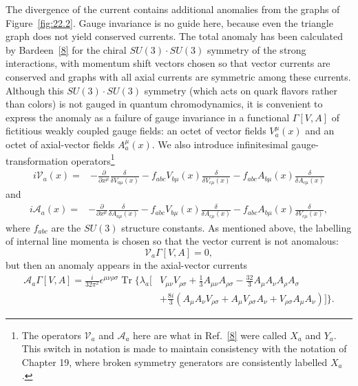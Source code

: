 The divergence of the current contains additional anomalies from the graphs
of Figure~\ref{fig:22.2}. Gauge invariance is no guide here, because even
the triangle graph does not yield conserved currents. The total anomaly has
been calculated by Bardeen~\hyperref[ch22-ref-8]{[8]} for the chiral
$SU(3)\cdot SU(3)$ symmetry of the strong interactions, with momentum shift
vectors chosen so that vector currents are conserved and graphs with all
axial currents are symmetric among these currents. Although this
$SU(3)\cdot SU(3)$ symmetry (which acts on quark flavors rather than colors)
is not gauged in quantum chromodynamics, it is convenient to express the
anomaly as a failure of gauge invariance in a functional $\Gamma[V,A]$ of
fictitious weakly coupled gauge fields: an octet of vector fields
$V_a^\mu(x)$ and an octet of axial-vector fields $A_a^\mu(x)$. We also
introduce infinitesimal gauge-transformation operators\footnote{The
operators $\mathcal V_a$ and $\mathcal A_a$ here are what in
Ref.~\hyperref[ch22-ref-8]{[8]} were called $X_a$ and $Y_a$. This switch in
notation is made to maintain consistency with the notation of Chapter 19,
where broken symmetry generators are consistently labelled $X_a$.}
\begin{equation}
 \begin{aligned}
 i\mathcal V_a(x)
 ={}&-\frac{\partial}{\partial x^\mu}
 \frac{\delta}{\delta V_{a\mu}(x)}
 -f_{abc}V_{b\mu}(x)\frac{\delta}{\delta V_{c\mu}(x)}
 -f_{abc}A_{b\mu}(x)\frac{\delta}{\delta A_{c\mu}(x)}
 \end{aligned}
 \tag{22.3.31}\label{eq:22.3.31}
\end{equation}
and
\begin{equation}
 \begin{aligned}
 i\mathcal A_a(x)
 ={}&-\frac{\partial}{\partial x^\mu}
 \frac{\delta}{\delta A_{a\mu}(x)}
 -f_{abc}V_{b\mu}(x)\frac{\delta}{\delta A_{c\mu}(x)}
 -f_{abc}A_{b\mu}(x)\frac{\delta}{\delta V_{c\mu}(x)},
 \end{aligned}
 \tag{22.3.32}\label{eq:22.3.32}
\end{equation}
where $f_{abc}$ are the $SU(3)$ structure constants. As mentioned above,
the labelling of internal line momenta is chosen so that the vector current
is not anomalous:
\begin{equation}
 \mathcal V_a\Gamma[V,A]=0,
 \tag{22.3.33}\label{eq:22.3.33}
\end{equation}
but then an anomaly appears in the axial-vector currents
\begin{equation}
 \begin{aligned}
 \mathcal A_a\Gamma[V,A]
 =\frac{i}{32\pi^2}\epsilon^{\mu\nu\rho\sigma}
 \operatorname{Tr}\Biggl\{\lambda_a\Biggl[
 &V_{\mu\nu}V_{\rho\sigma}
 +\frac13A_{\mu\nu}A_{\rho\sigma}
 -\frac{32}{3}A_\mu A_\nu A_\rho A_\sigma
 \\
 &+\frac{8i}{3}\left(
  A_\mu A_\nu V_{\rho\sigma}
  +A_\mu V_{\rho\sigma}A_\nu
  +V_{\rho\sigma}A_\mu A_\nu
 \right)
 \Biggr]\Biggr\}.
 \end{aligned}
 \tag{22.3.34}\label{eq:22.3.34}
\end{equation}

